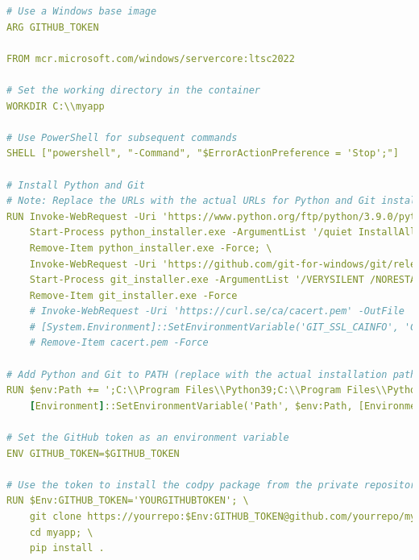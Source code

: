 \documentclass{article}
\begin{document}
\begin{lstlisting}[language=yaml]
# Use a Windows base image
ARG GITHUB_TOKEN

FROM mcr.microsoft.com/windows/servercore:ltsc2022

# Set the working directory in the container
WORKDIR C:\\myapp

# Use PowerShell for subsequent commands
SHELL ["powershell", "-Command", "$ErrorActionPreference = 'Stop';"]

# Install Python and Git
# Note: Replace the URLs with the actual URLs for Python and Git installers
RUN Invoke-WebRequest -Uri 'https://www.python.org/ftp/python/3.9.0/python-3.9.0-amd64.exe' -OutFile 'python_installer.exe' -UseBasicParsing; \
    Start-Process python_installer.exe -ArgumentList '/quiet InstallAllUsers=1 PrependPath=1' -Wait; \
    Remove-Item python_installer.exe -Force; \
    Invoke-WebRequest -Uri 'https://github.com/git-for-windows/git/releases/download/v2.28.0.windows.1/Git-2.28.0-64-bit.exe' -OutFile 'git_installer.exe' -UseBasicParsing; \
    Start-Process git_installer.exe -ArgumentList '/VERYSILENT /NORESTART /NOCANCEL /SP-' -Wait; \
    Remove-Item git_installer.exe -Force
    # Invoke-WebRequest -Uri 'https://curl.se/ca/cacert.pem' -OutFile 'cacert.pem'; \
    # [System.Environment]::SetEnvironmentVariable('GIT_SSL_CAINFO', 'C:\codpy\cacert.pem', [System.EnvironmentVariableTarget]::Machine); \
    # Remove-Item cacert.pem -Force

# Add Python and Git to PATH (replace with the actual installation paths if different)
RUN $env:Path += ';C:\\Program Files\\Python39;C:\\Program Files\\Python39\\Scripts;C:\\Program Files\\Git\\cmd'; \
    [Environment]::SetEnvironmentVariable('Path', $env:Path, [EnvironmentVariableTarget]::Machine)

# Set the GitHub token as an environment variable
ENV GITHUB_TOKEN=$GITHUB_TOKEN

# Use the token to install the codpy package from the private repository
RUN $Env:GITHUB_TOKEN='YOURGITHUBTOKEN'; \
    git clone https://yourrepo:$Env:GITHUB_TOKEN@github.com/yourrepo/myapp.git; \
    cd myapp; \
    pip install .


\end{lstlisting}
\end{document}
